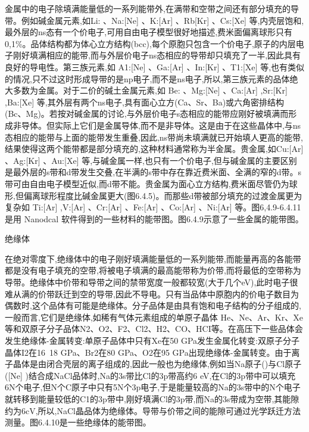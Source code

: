 金属中的电子除填满能量低的一系列能带外,在满带和空带之间还有部分填充的导带。例如碱金属元素,如Li: 、Na:[Ne] 、K:[Ar] 、Rb[Kr] 、Cs:[Xe] 等,内壳层饱和,最外层的ns态有一个价电子,可用自由电子模型很好地描述,费米面偏离球形只有0,1\%。品体结构都为体心立方结构(bcc),每个原胞只包含一个价电子,原子的内层电子刚好填满相应的能带,而与外层价电子ns态相应的导带却只填充了一半,因此具有良好的导电性。第三族元素,如 A1:[Ne] 、Ga:[Ar] 、In:[Kr] 、T1:[Xe] 等,也有类似的情况,只不过这时形成导带的是np电子,而不是ns电子,所以,第三族元素的品体绝大多数为金属。对于二价的碱土金属元素,如 Be: 、Mg:[Ne] 、Ca:[Ar] ,Sr:[Kr]  ,Ba:[Xe]  等,其外层有两个ns电子,具有面心立方(Ca、Sr、Ba)或六角密排结构(Bc、Mg)。若按对碱金属的讨论,与外层价电子s态相应的能带应刚好被填满而形成非导体。但实际上它们是金属导体,而不是非导体。这是由于在这些晶体中,与ns态相应的能带与上面的能带发生重叠,因此,ns带尚未填满就已开始填人更高的能带,结果使得这两个能带都是部分填充的,这种材料通常称为半金属。贵金属,如Cu:[Ar] 、Ag:[Kr] 、Au:[Xe] 等,与碱金属一样,也只有一个价电子,但与碱金属的主要区别是最外层的s带和d带发生交叠,在半满的s带中存在靠近费米面、全满的窄的d带。s带可由自由电子模型近似,而d带不能。贵金属为面心立方结构,费米面尽管仍为球形,但偏离球形程度比碱金属更大(图6.4.5)。而那些d带被部分填充的过渡金属更为复杂如 Ti:[Ar] ,V:[Ar] 、Cr:[Ar] 、Fe:[Ar] 、Co:[Ar] 、Ni:[Ar] 等。图6,4.9-6.4.11是用 Nanodcal 软件得到的一些材料的能带图。图6.4.9示意了一些金属的能带图。



绝缘体

在绝对零度下,绝缘体中的电子刚好填满能量低的一系列能带,而能量再高的各能带都是没有电子填充的空带,将被电子填满的最高能带称为价带,而将最低的空带称为导带。绝缘体中价带和导带之间的禁带宽度一般都较宽(大于几个eV),此时电子很难从满的价带跃迁到空的导带,因此不导电。只有当品体中原胞内的价电子数目为偶数时,这个品体有可能是绝缘体。分子品体是由具有饱和电子结构的分子组成的,一般而言,它们是绝缘体,如稀有气体元素组成的单原子晶体 He、Ne、Ar、Kr、Xe等和双原子分子品体N2、O2、F2、Cl2、H2、CO、HCI等。在高压下一些品体会发生绝缘体-金属转变:单原子品体中只有Xe在50 GPa发生金属化转变:双原子分子晶体I2在16~18 GPa、Br2在80 GPa、O2在95 GPa出现绝缘体-金属转变。由于离子晶体是由闭合壳层的离子组成的,因此一般也为绝缘体,例如当Na原子()与Cl原子([Ne] )结合成NaCl品体时,Na的3s带比Cl的3p带高约6 eV,在Cl的3p带中可以填充6N个电子,但N个C原子中只有5N个3p电子,于是能量较高的Na的3s带中的N个电子就转移到能量较低的C1的3p带中,刚好填满Cl的3p带,而Na的3s带成为空带,其能隙约为6cV,所以,NaCl晶品体为绝缘体。导带与价带之间的能隙可通过光学跃迁方法测量。图6.4.10是一些绝缘体的能带图。



